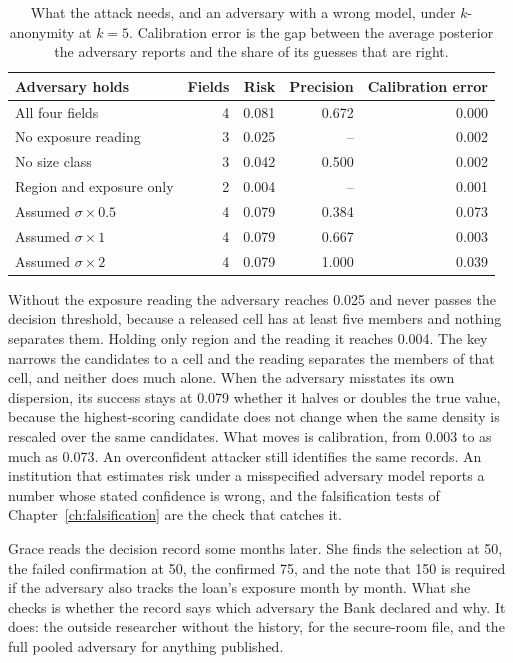 \begin{table}[ht]
\centering
\caption{What the attack needs, and an adversary with a wrong model, under
$k$-anonymity at $k=5$. Calibration error is the gap between the average posterior
the adversary reports and the share of its guesses that are right.}
\label{c13:tab-ablation}
\small
\begin{tabular}{lrrrr}
\toprule
Adversary holds & Fields & Risk & Precision & Calibration error \\
\midrule
All four fields             & 4 & 0.081 & 0.672 & 0.000 \\
No exposure reading         & 3 & 0.025 & --    & 0.002 \\
No size class               & 3 & 0.042 & 0.500 & 0.002 \\
Region and exposure only    & 2 & 0.004 & --    & 0.001 \\
\midrule
Assumed $\sigma \times 0.5$ & 4 & 0.079 & 0.384 & 0.073 \\
Assumed $\sigma \times 1$   & 4 & 0.079 & 0.667 & 0.003 \\
Assumed $\sigma \times 2$   & 4 & 0.079 & 1.000 & 0.039 \\
\bottomrule
\end{tabular}
\end{table}

Without the exposure reading the adversary reaches 0.025 and never passes the
decision threshold, because a released cell has at least five members and nothing
separates them. Holding only region and the reading it reaches 0.004. The key narrows
the candidates to a cell and the reading separates the members of that cell, and
neither does much alone. When the adversary misstates its own dispersion, its success
stays at 0.079 whether it halves or doubles the true value, because the
highest-scoring candidate does not change when the same density is rescaled over the
same candidates. What moves is
calibration, from 0.003 to as much as 0.073.
An overconfident attacker still identifies the same records. An institution that
estimates risk under a misspecified adversary model reports a number whose stated
confidence is wrong, and the falsification tests of Chapter~\ref{ch:falsification}
are the check that catches it.

Grace reads the decision record some months later. She finds the selection at 50,
the failed confirmation at 50, the confirmed 75, and the note that 150 is required if
the adversary also tracks the loan's exposure month by month. What she checks is
whether the record says which adversary the Bank declared and why. It does: the
outside researcher without the history, for the secure-room file, and the full
pooled adversary for anything published.

